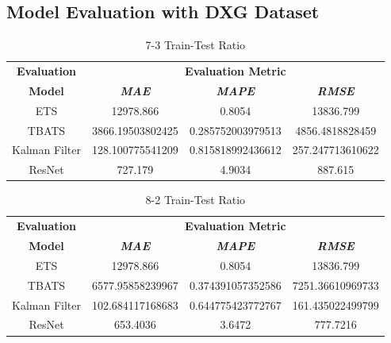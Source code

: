 \documentclass[conference]{IEEEtran}
\begin{document}
\newpage

\subsection{Model Evaluation with DXG Dataset}

\begin{table}[htbp]
\caption{7-3 Train-Test Ratio}
\begin{center}
\begin{tabular}{|c|c|c|c|}
\hline
\textbf{Evaluation}&\multicolumn{3}{|c|}{\textbf{Evaluation Metric}} \\
\cline{2-4} 
\textbf{Model} & \textbf{\textit{MAE}}& \textbf{\textit{MAPE}}& \textbf{\textit{RMSE}} \\
\hline
ETS & 12978.866 & 0.8054 & 13836.799\\
\hline
TBATS & 3866.19503802425 & 0.285752003979513 & 4856.4818828459\\
\hline
Kalman Filter & 128.100775541209 & 0.815818992436612 & 257.247713610622\\
\hline
ResNet & 727.179 & 4.9034 & 887.615\\
\hline
\end{tabular}
\label{tab1}
\end{center}
\end{table}

\begin{table}[htbp]
\caption{8-2 Train-Test Ratio}
\begin{center}
\begin{tabular}{|c|c|c|c|}
\hline
\textbf{Evaluation}&\multicolumn{3}{|c|}{\textbf{Evaluation Metric}} \\
\cline{2-4} 
\textbf{Model} & \textbf{\textit{MAE}}& \textbf{\textit{MAPE}}& \textbf{\textit{RMSE}} \\
\hline
ETS & 12978.866 & 0.8054 & 13836.799\\
\hline
TBATS & 6577.95858239967 & 0.374391057352586 & 7251.36610969733\\
\hline
Kalman Filter & 102.684117168683 & 0.644775423772767 & 161.435022499799\\
\hline
ResNet & 653.4036 & 3.6472 & 777.7216\\
\hline
\end{tabular}
\label{tab1}
\end{center}
\end{table}
\end{document}
